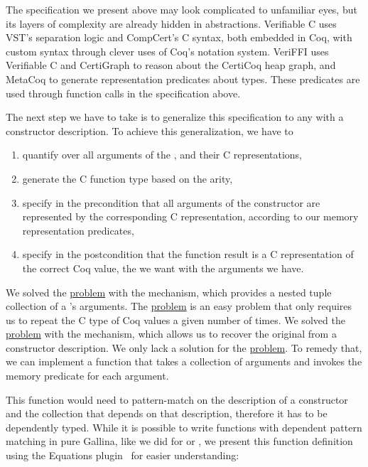 The specification we present above may look complicated to unfamiliar eyes, but its layers of complexity are already hidden in abstractions. Verifiable C uses VST's separation logic and CompCert's C syntax, both embedded in Coq, with custom syntax through clever uses of Coq's notation system. VeriFFI uses Verifiable C and CertiGraph to reason about the \gls{CertiCoq heap} graph, and MetaCoq to generate representation predicates about types. These predicates are used through function calls in the specification above.

The next step we have to take is to generalize this specification to any \constructor{} with a constructor description. To achieve this generalization, we have to
\begin{enumerate}
\item \label{gen1} quantify over all arguments of the \constructor{}, and their C representations, %
\item \label{gen2} generate the C function type based on the \constructor{} arity,
\item \label{gen3} specify in the precondition that all arguments of the constructor are represented by the corresponding C representation, according to our memory representation predicates,
\item \label{gen4} specify in the postcondition that the function result is a C representation of the correct Coq value, the \constructor{} we want with the arguments we have.
\end{enumerate}

\newcommand\prord[1]{\hyperref[#1]{\ordinaltoname{\getrefnumber{#1}} problem}}

We solved the \prord{gen1} with the \args{} mechanism, which provides a nested tuple collection of a \constructor{}'s arguments. The \prord{gen2} is an easy problem that only requires us to repeat the C type of Coq values a given number of times. We solved the \prord{gen4} with the \ctorreflected{} mechanism, which allows us to recover the original \constructor{} from a constructor description. We only lack a solution for the \prord{gen3}. To remedy that, we can implement a function that takes a collection of arguments and invokes the memory predicate for each argument.

This function would need to pattern-match on the \reified{} description of a constructor and the \args{} collection that depends on that description, therefore it has to be dependently typed. While it is possible to write functions with dependent pattern matching in pure \gls{Gallina}, like we did for \appenddescs{} or \result{}, we present this function definition using the Equations plugin~\cite{sozeau2019equations} for easier understanding:

